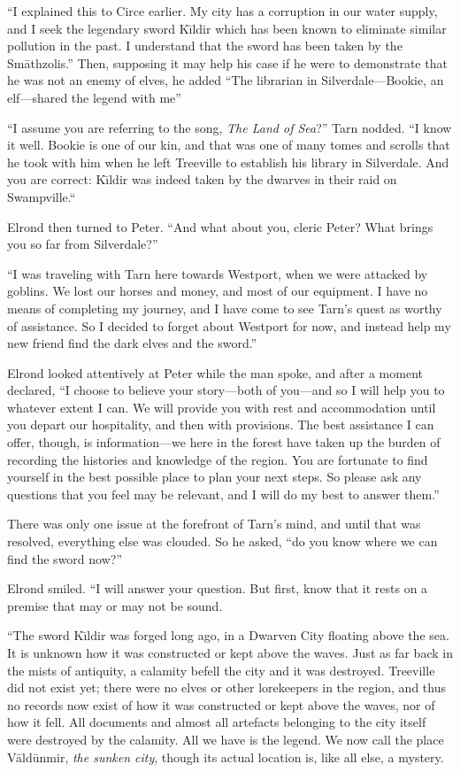 ``I explained this to Circe earlier.  My city has a corruption in our water supply, and I seek the legendary sword K\=\i{}ldir which has been known to eliminate similar pollution in the past.  I understand that the sword has been taken by the Sm\=athzolis.'' Then, supposing it may help his case if he were to demonstrate that he was not an enemy of elves, he added ``The librarian in Silverdale---Bookie, an elf---shared the legend with me''

``I assume you are referring to the song, \emph{The Land of Sea}?''
Tarn nodded.
``I know it well.  Bookie is one of our kin, and that was one of many tomes and scrolls that he took with him when he left Treeville to establish his library in Silverdale.  And you are correct: K\=\i{}ldir was indeed taken by the dwarves in their raid on Swampville.``

Elrond then turned to Peter.  ``And what about you, cleric Peter?  What brings you so far from Silverdale?''

``I was traveling with Tarn here towards Westport, when we were attacked by goblins.  We lost our horses and money, and most of our equipment.  I have no means of completing my journey, and I have come to see Tarn's quest as worthy of assistance.  So I decided to forget about Westport for now, and instead help my new friend find the dark elves and the sword.''

Elrond looked attentively at Peter while the man spoke, and after a moment declared, ``I choose to believe your story---both of you---and so I will help you to whatever extent I can.  We will provide you with rest and accommodation until you depart our hospitality, and then with provisions.  The best assistance I can offer, though, is information---we here in the forest have taken up the burden of recording the histories and knowledge of the region.  You are fortunate to find yourself in the best possible place to plan your next steps.  So please ask any questions that you feel may be relevant, and I will do my best to answer them.''

There was only one issue at the forefront of Tarn's mind, and until that was resolved, everything else was clouded.  So he asked, ``do you know where we can find the sword now?''

Elrond smiled.  ``I will answer your question.  But first, know that it rests on a premise that may or may not be sound.

``The sword K\=\i{}ldir was forged long ago, in a Dwarven City floating above the sea.  It is unknown how it was constructed or kept above the waves.  Just as far back in the mists of antiquity, a calamity befell the city and it was destroyed.  Treeville did not exist yet; there were no elves or other lorekeepers in the region, and thus no records now exist of how it was constructed or kept above the waves, nor of how it fell.  All documents and almost all artefacts belonging to the city itself were destroyed by the calamity.  All we have is the legend.  We now call the place V\=ald\=unmir, \emph{the sunken city}, though its actual location is, like all else, a mystery.

